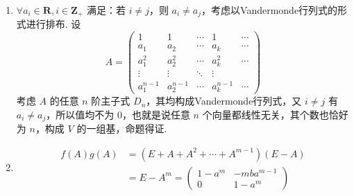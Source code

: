 \begin{enumerate}
    \item $\forall a_i \in \mathbf{R}, i \in \mathbf{Z}_{+}$ 满足：若 $i \neq j$，则 $a_i \neq a_j$，考虑以Vandermonde行列式的形式进行排布. 设
          \[ A = \begin{pmatrix}
                  1         & 1         & \cdots & 1         & \cdots \\
                  a_1       & a_2       & \cdots & a_k       & \cdots \\
                  a_1^2     & a_2^2     & \cdots & a_k^2     & \cdots \\
                  \vdots    & \vdots    & \ddots & \vdots    &        \\
                  a_1^{n-1} & a_2^{n-1} & \cdots & a_k^{n-1} & \cdots
              \end{pmatrix}\]
          考虑 $A$ 的任意 $n$ 阶主子式 $D_n$，其均构成Vandermonde行列式，又 $i \neq j$ 有 $a_i \neq a_j$，所以值均不为 0，也就是说任意 $n$ 个向量都线性无关，其个数也恰好为 $n$，构成 $V$ 的一组基，命题得证.

    \item \begin{align*}
              f(A) g(A) & = (E + A + A^2 + \cdots + A^{m - 1})(E - A) \\
                        & = E - A^m = \begin{pmatrix}
                                          1 - a^m & -mba^{m - 1} \\
                                          0       & 1 - a^m
                                      \end{pmatrix}
          \end{align*}


\end{enumerate}
